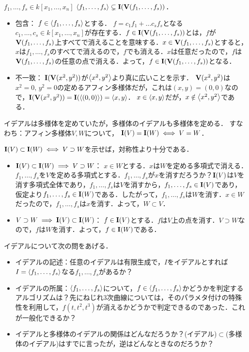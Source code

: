 \documentclass[9pt]{ltjsarticle}
\begin{document}
$f_1,\dots,f_s \in k[x_1,\dots,x_n]$
$\left\langle f_1,\dots,f_s \right\rangle\subsetneq \textbf I(\textbf V(f_1,\dots,f_s))$．
\begin{myproof}
 \begin{itemize}
  \item 包含：
$f\in \left\langle f_1,\dots,f_s \right\rangle$とする．
$f=c_1 f_1 + \dots c_s f_s$となる$c_1,\dots,c_s \in k[x_1,\dots,x_n]$が存在する．$f\in \textbf I(\textbf V(f_1,\dots,f_s))$とは，$f$が$\textbf V(f_1,\dots,f_s)$上すべてで消えることを意味する．$x\in \textbf V(f_1,\dots,f_s)$とすると，$x$は$f_1,\dots,f_s$のすべてで消えるので，$f$でも消える．$x$は任意だったので，$f$は$\textbf V(f_1,\dots,f_s)$の任意の点で消える．よって，$f\in \textbf I(\textbf V(f_1,\dots,f_s))$となる．
  \item 不一致：
$\textbf I(\textbf V(x^2,y^2))$が$\left\langle x^2,y^2 \right\rangle$より真に広いことを示す．
$\textbf V(x^2,y^2)$は$x^2=0,\,y^2=0$の定めるアフィン多様体だが，これは$(x,y)=(0,0)$なので，$\textbf I(\textbf V(x^2,y^2))=\textbf I(\left\langle (0,0) \right\rangle)=\left\langle x,y \right\rangle$．
$x\in \left\langle x,y \right\rangle$だが，$x\notin \left\langle x^2,y^2 \right\rangle$である．
 \end{itemize}
\end{myproof}

イデアルは多様体を定めていたが，多様体のイデアルも多様体を定める．
すなわち：アフィン多様体$V,W$について，
$\textbf I(V)=\textbf I(W) \iff V=W$．
\begin{myproof}
 $\textbf I(V)\subset \textbf I(W)\iff V\supset W$を示せば，対称性より十分である．
\begin{itemize}
 \item $\textbf I(V)\subset \textbf I(W)\implies V\supset W$：
$x\in W$とする．$x$は$W$を定める多項式で消える．$f_1,\dots,f_s$を$V$を定める多項式とする．$f_1,\dots,f_s$が$x$を消すだろうか？$\textbf I(V)$は$V$を消す多項式全体であり，$f_1,\dots,f_s$は$V$を消すから，$f_1,\dots,f_s \in \textbf I(V)$であり，仮定より$f_1,\dots,f_s \in \textbf I(W)$である．したがって，$f_1,\dots,f_s$は$W$を消す．$x\in W$だったので，$f_1,\dots,f_s$は$x$を消す．よって，$W\subset V$．
 \item $V\supset W \implies \textbf I(V)\subset \textbf I(W)$：
$f\in \textbf I(V)$とする．$f$は$V$上の点を消す．$V\supset W$なので，$f$は$W$を消す．よって，$f\in \textbf I(W)$である．
\end{itemize}
\end{myproof}

イデアルについて次の問をあげる．
\begin{itemize}
 \item イデアルの記述：任意のイデアルは有限生成で，$I$をイデアルとすれば$I=\left\langle f_1,\dots,f_s \right\rangle$なる$f_1,\dots,f_s$があるか？
 \item イデアルの所属：$\left\langle f_1,\dots,f_s \right\rangle$について，$f\in \left\langle f_1,\dots,f_s \right\rangle$かどうかを判定するアルゴリズムは？先にねじれ3次曲線については，そのパラメタ付けの特殊性を利用して，$f(t,t^2,t^3)$が消えるかどうかで判定できるのであった．これが一般化できるか？
 \item イデアルと多様体のイデアルの関係はどんなだろうか？(イデアル)$\subset$(多様体のイデアル)はすでに言ったが，逆はどんなときなのだろうか？
\end{itemize}
\end{document}
